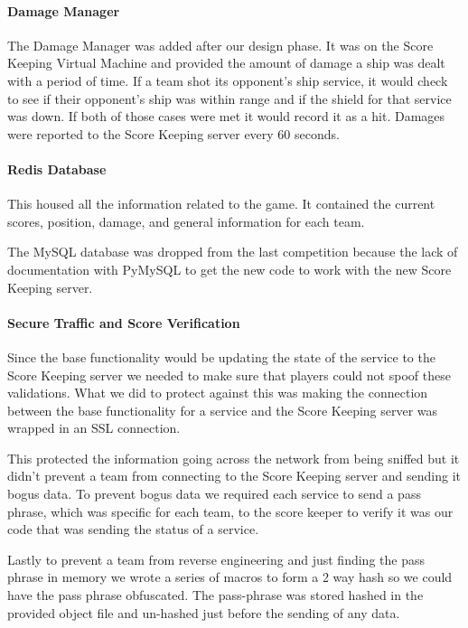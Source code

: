\documentclass[10pt]{article}
\begin{document}
\paragraph*{Damage Manager}
The Damage Manager was added after our design phase. It was on the Score
Keeping Virtual Machine and provided the amount of damage a ship was dealt with
a period of time. If a team shot its opponent's ship service, it would check to
see if their opponent's ship was within range and if the shield for that service was
down. If both of those cases were met it would record it as a hit. 
Damages were reported to the Score Keeping server every 60 seconds.

\paragraph*{Redis Database}
This housed all the information related to the game. It contained the current
scores, position, damage, and general information for each team.

The MySQL database was dropped from the last competition because the lack of
documentation with PyMySQL to get the new code to work with the new Score
Keeping server.

\paragraph*{Secure Traffic and Score Verification}
Since the base functionality would be updating the state of the service to the
Score Keeping server we needed to make sure that players could not spoof these
validations. What we did to protect against this was making the connection
between the base functionality for a service and the Score Keeping server was
wrapped in an SSL connection.

This protected the information going across the network from being sniffed but it 
didn't prevent a team from connecting to the Score Keeping server and sending it bogus 
data. To prevent bogus data we required each service to send a pass phrase, which
was specific for each team, to the score keeper to verify it was our code that
was sending the status of a service.

Lastly to prevent a team from reverse engineering and just finding the pass phrase in
memory we wrote a series of macros to form a 2 way hash so we could have the pass phrase
obfuscated. The pass-phrase was stored hashed in the provided object file and
un-hashed just before the sending of any data.
\end{document}
